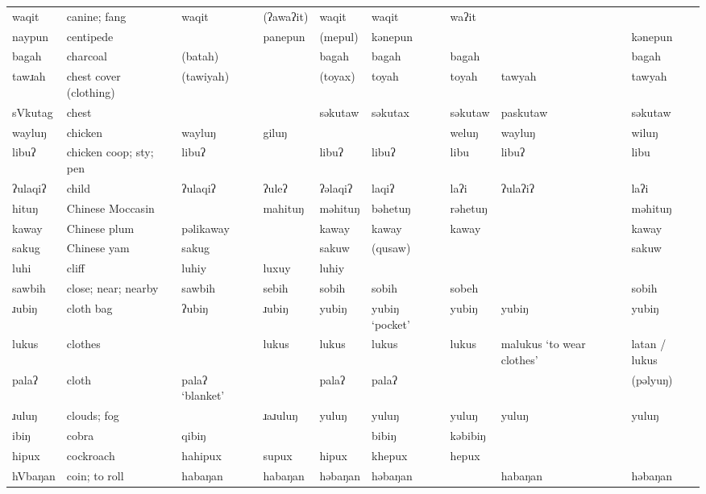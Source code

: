 \begin{landscape}
\begin{longtable}{*{9}{>{\raggedright\arraybackslash}p{}}}
\text{*}waqit        & canine; fang & waqit & (ʔawaʔit) & waqit & waqit & waʔit &  & \\
\text{*}naypun      & centipede &  & panepun & (mepul) & kənepun &  &  & kənepun\\
\text{*}bagah        & charcoal & (batah) &  & bagah & bagah & bagah &  & bagah\\
\text{*}tawɹah       & chest cover (clothing) & (tawiyah) &  & (toyax) & toyah & toyah & tawyah & tawyah\\
\text{*}sVkutag      & chest &  &  & səkutaw & səkutax & səkutaw & paskutaw & səkutaw\\
\text{*}wayluŋ       & chicken & wayluŋ & giluŋ &  &  & weluŋ & wayluŋ & wiluŋ\\
\text{*}libuʔ        & chicken coop; sty; pen & libuʔ &  & libuʔ & libuʔ & libu & libuʔ & libu\\
\text{*}ʔulaqiʔ      & child & ʔulaqiʔ & ʔuleʔ & ʔəlaqiʔ & laqiʔ & laʔi & ʔulaʔiʔ & laʔi\\
\text{*}hituŋ       & Chinese Moccasin &  & mahituŋ & məhituŋ & bəhetuŋ & rəhetuŋ &  & məhituŋ\\
\text{*}kaway        & Chinese plum & pəlikaway &  & kaway & kaway & kaway &  & kaway\\
\text{*}sakug        & Chinese yam & sakug &  & sakuw & (qusaw) &  &  & sakuw\\
\text{*}luhi         & cliff & luhiy & luxuy & luhiy &  &  &  & \\
\text{*}sawbih       & close; near; nearby & sawbih & sebih & sobih & sobih & sobeh &  & sobih\\
\text{*}ɹubiŋ        & cloth bag & ʔubiŋ & ɹubiŋ & yubiŋ & yubiŋ `pocket' & yubiŋ & yubiŋ & yubiŋ\\
\text{*}lukus        & clothes &  & lukus & lukus & lukus & lukus & malukus `to wear clothes' & latan / lukus\\
\text{*}palaʔ        & cloth & palaʔ \newline `blanket' &  & palaʔ & palaʔ &  &  & (pəlyuŋ)\\
\text{*}ɹuluŋ        & clouds; fog &  & ɹaɹuluŋ & yuluŋ & yuluŋ & yuluŋ & yuluŋ & yuluŋ\\
\text{*}ibiŋ        & cobra & qibiŋ &  &  & bibiŋ & kəbibiŋ &  & \\
\text{*}hipux        & cockroach & hahipux & supux & hipux & khepux & hepux &  & \\
\text{*}hVbaŋan      & coin; to roll & habaŋan & habaŋan & həbaŋan & həbaŋan &  & habaŋan & həbaŋan\\

\end{longtable}
\end{landscape}
